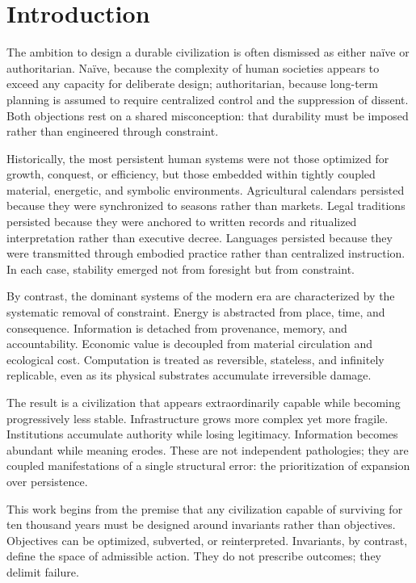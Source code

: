 \documentclass[12pt,oneside]{book}
\begin{document}
\tableofcontents

\mainmatter

\chapter{Introduction}

The ambition to design a durable civilization is often dismissed as either naïve or authoritarian. Naïve, because the complexity of human societies appears to exceed any capacity for deliberate design; authoritarian, because long-term planning is assumed to require centralized control and the suppression of dissent. Both objections rest on a shared misconception: that durability must be imposed rather than engineered through constraint.

Historically, the most persistent human systems were not those optimized for growth, conquest, or efficiency, but those embedded within tightly coupled material, energetic, and symbolic environments. Agricultural calendars persisted because they were synchronized to seasons rather than markets. Legal traditions persisted because they were anchored to written records and ritualized interpretation rather than executive decree. Languages persisted because they were transmitted through embodied practice rather than centralized instruction. In each case, stability emerged not from foresight but from constraint.

By contrast, the dominant systems of the modern era are characterized by the systematic removal of constraint. Energy is abstracted from place, time, and consequence. Information is detached from provenance, memory, and accountability. Economic value is decoupled from material circulation and ecological cost. Computation is treated as reversible, stateless, and infinitely replicable, even as its physical substrates accumulate irreversible damage.

The result is a civilization that appears extraordinarily capable while becoming progressively less stable. Infrastructure grows more complex yet more fragile. Institutions accumulate authority while losing legitimacy. Information becomes abundant while meaning erodes. These are not independent pathologies; they are coupled manifestations of a single structural error: the prioritization of expansion over persistence.

This work begins from the premise that any civilization capable of surviving for ten thousand years must be designed around invariants rather than objectives. Objectives can be optimized, subverted, or reinterpreted. Invariants, by contrast, define the space of admissible action. They do not prescribe outcomes; they delimit failure.
\end{document}
